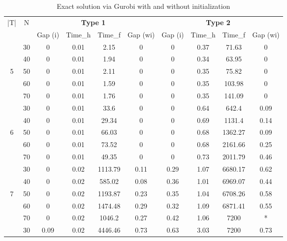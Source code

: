 \documentclass{itor}
\theoremstyle{definition}
\theoremstyle{remark}
\begin{document}
\begin{table}[htbp]
  \centering
  	\tiny
	\caption{Exact solution via Gurobi with and without initialization}
    \begin{tabular}{|c|c|cccc|cccc|}
    \toprule
    \multirow{2}[2]{*}{|T|} & \multirow{2}[2]{*}{N} &       & \multicolumn{2}{c}{\textbf{Type 1}} &       &       & \multicolumn{2}{c}{\textbf{Type 2}} &  \\
          &       & Gap (i) & Time\_h & Time\_f & Gap (wi) & Gap (i) & Time\_h & Time\_f & Gap (wi) \\
    \midrule
          & 30    & 0     & 0.01  & 2.15  & 0     & 0     & 0.37  & 71.63 & 0 \\
          & 40    & 0     & 0.01  & 1.94  & 0     & 0     & 0.34  & 63.95 & 0 \\
    5     & 50    & 0     & 0.01  & 2.11  & 0     & 0     & 0.35  & 75.82 & 0 \\
          & 60    & 0     & 0.01  & 1.59  & 0     & 0     & 0.35  & 103.98 & 0 \\
          & 70    & 0     & 0.01  & 1.76  & 0     & 0     & 0.35  & 141.09 & 0 \\
    \midrule
          & 30    & 0     & 0.01  & 33.6  & 0     & 0     & 0.64  & 642.4 & 0.09 \\
          & 40    & 0     & 0.01  & 29.34 & 0     & 0     & 0.69  & 1131.4 & 0.14 \\
    6     & 50    & 0     & 0.01  & 66.03 & 0     & 0     & 0.68  & 1362.27 & 0.09 \\
          & 60    & 0     & 0.01  & 73.52 & 0     & 0     & 0.68  & 2161.66 & 0.25 \\
          & 70    & 0     & 0.01  & 49.35 & 0     & 0     & 0.73  & 2011.79 & 0.46 \\
    \midrule
          & 30    & 0     & 0.02  & 1113.79 & 0.11  & 0.29  & 1.07  & 6680.17 & 0.62 \\
          & 40    & 0     & 0.02  & 585.02 & 0.08  & 0.36  & 1.01  & 6969.07 & 0.44 \\
    7     & 50    & 0     & 0.02  & 1193.87 & 0.23  & 0.35  & 1.04  & 6708.26 & 0.58 \\
          & 60    & 0     & 0.02  & 1474.48 & 0.29  & 0.32  & 1.09  & 6871.41 & 0.55 \\
          & 70    & 0     & 0.02  & 1046.2 & 0.27  & 0.42  & 1.06  & 7200  & * \\
    \midrule
          & 30    & 0.09  & 0.02  & 4446.46 & 0.73  & 0.63  & 3.03  & 7200  & 0.73 \\

\end{tabular}
\end{table}
\end{document}
